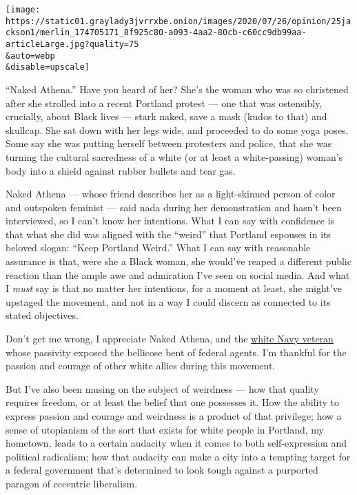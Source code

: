 \texttt{[image: https://static01.graylady3jvrrxbe.onion/images/2020/07/26/opinion/25jackson1/merlin\_174705171\_8f925c80-a093-4aa2-80cb-c60cc9db99aa-articleLarge.jpg?quality=75\\\&auto=webp\\\&disable=upscale]}

``Naked Athena.'' Have you heard of her? She's the woman who was so
christened after she strolled into a recent Portland protest --- one
that was ostensibly, crucially, about Black lives --- stark naked, save
a mask (kudos to that) and skullcap. She sat down with her legs wide,
and proceeded to do some yoga poses. Some say she was putting herself
between protesters and police, that she was turning the cultural
sacredness of a white (or at least a white-passing) woman's body into a
shield against rubber bullets and tear gas.

Naked Athena --- whose friend describes her as a light-skinned person of
color and outspoken feminist --- said nada during her demonstration and
hasn't been interviewed, so I can't know her intentions. What I can say
with confidence is that what she did was aligned with the ``weird'' that
Portland espouses in its beloved slogan: ``Keep Portland Weird.'' What I
can say with reasonable assurance is that, were she a Black woman, she
would've reaped a different public reaction than the ample awe and
admiration I've seen on social media. And what I \emph{must} say is that
no matter her intentions, for a moment at least, she might've upstaged
the movement, and not in a way I could discern as connected to its
stated objectives.

Don't get me wrong, I appreciate Naked Athena, and the
\href{https://uk.reuters.com/article/uk-global-race-protests-portland-veteran/navy-veteran-says-he-was-beaten-like-a-punching-bag-in-portland-idUKKCN24L2DN}{white
Navy veteran} whose passivity exposed the bellicose bent of federal
agents. I'm thankful for the passion and courage of other white allies
during this movement.

But I've also been musing on the subject of weirdness --- how that
quality requires freedom, or at least the belief that one possesses it.
How the ability to express passion and courage and weirdness is a
product of that privilege; how a sense of utopianism of the sort that
exists for white people in Portland, my hometown, leads to a certain
audacity when it comes to both self-expression and political radicalism;
how that audacity can make a city into a tempting target for a federal
government that's determined to look tough against a purported paragon
of eccentric liberalism.

